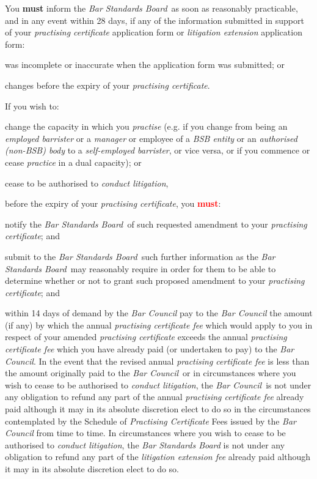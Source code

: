 
You \textcolor{myred}{\textbf{must }}inform the \emph{Bar Standards Board}~as soon as reasonably
practicable, and in any event within 28 days, if any of the information
submitted in support of your \emph{practising certificate} application
form or \emph{litigation extension} application form:\nl\item was incomplete or inaccurate when the application form was submitted;
or
\item changes before the expiry of your \emph{practising certificate}.
\ln
{}

If you wish to:\nl\item change the capacity in which you \emph{practise} (e.g. if you change
from being an \emph{employed barrister} or a \emph{manager} or employee
of a \emph{BSB entity} or an \emph{authorised (non-BSB) body} to a
\emph{self-employed barrister}, or vice versa, or if you commence or
cease \emph{practice} in a dual capacity); or
\item cease to be authorised to \emph{conduct litigation},

before the expiry of your \emph{practising certificate}, you \textcolor{red}{\textbf{must}}:
\al
\item notify the \emph{Bar Standards Board~}of such requested amendment to
your \emph{practising certificate}; and

\item submit to the \emph{Bar Standards Board}~such further information as
the \emph{Bar Standards Board}~may reasonably require in order for them
to be able to determine whether or not to grant such proposed amendment
to your \emph{practising certificate}; and

\item within 14 days of demand by the \emph{Bar Council} pay to the
\emph{Bar Council} the amount (if any) by which the annual
\emph{practising certificate fee} which would apply to you in respect of
your amended \emph{practising certificate} exceeds the annual
\emph{practising certificate fee} which you have already paid (or
undertaken to pay) to the \emph{Bar Council}. In the event that the
revised annual \emph{practising certificate fee} is less than the amount
originally paid to the \emph{Bar Council}~or in circumstances where you
wish to cease to be authorised to \emph{conduct litigation}, the
\emph{Bar Council}~is not under any obligation to refund any part of the
annual \emph{practising certificate fee} already paid although it may in
its absolute discretion elect to do so in the circumstances contemplated
by the Schedule of \emph{Practising Certificate} Fees issued by the
\emph{Bar Council} from time to time. In circumstances where you wish to
cease to be authorised to \emph{conduct litigation}, the \emph{Bar
Standards Board} is not under any obligation to refund any part of the
\emph{litigation extension fee} already paid although it may in its
absolute discretion elect to do so.\la\ln
{}

